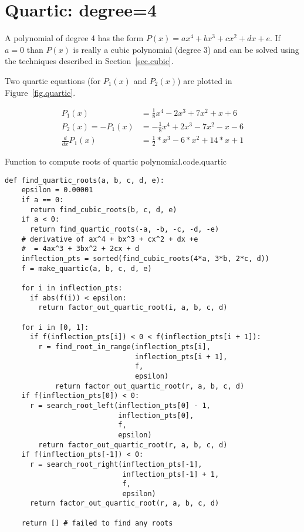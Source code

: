 \section{Quartic: degree=4}
\label{sec.quartic}

A polynomial of degree 4 has the form $P(x) = a x^4 + b x^3 + c x^2 + d x + e$. If $a=0$ than $P(x)$ is really
a cubic polynomial (degree 3) and can be solved using the techniques described in Section~\ref{sec.cubic}.

Two quartic equations (for $P_1(x)$ and $P_2(x)$) are plotted in Figure~\ref{fig.quartic}.


\begin{align*}
  P_1(x) &= \frac{1}{8}  x^4 -2 x^3 + 7  x^2 + x + 6\\
  P_2(x) = -P_1(x) &= -\frac{1}{8}  x^4 +2 x^3 - 7  x^2 - x - 6\\
  \frac{d}{dx} P_1(x) &= \frac{1}{2} * x^3 -6* x^2 + 14 * x + 1
\end{align*}


\begin{listing}{Function to compute roots of quartic polynomial.}{code.quartic}
\begin{minipage}[c]{0.98\textwidth}\begin{lstlisting}
def find_quartic_roots(a, b, c, d, e):
    epsilon = 0.00001
    if a == 0:
      return find_cubic_roots(b, c, d, e)
    if a < 0:
      return find_quartic_roots(-a, -b, -c, -d, -e)
    # derivative of ax^4 + bx^3 + cx^2 + dx +e
    #  = 4ax^3 + 3bx^2 + 2cx + d
    inflection_pts = sorted(find_cubic_roots(4*a, 3*b, 2*c, d))
    f = make_quartic(a, b, c, d, e)

    for i in inflection_pts:
      if abs(f(i)) < epsilon:
        return factor_out_quartic_root(i, a, b, c, d)

    for i in [0, 1]:
      if f(inflection_pts[i]) < 0 < f(inflection_pts[i + 1]):
        r = find_root_in_range(inflection_pts[i],
                               inflection_pts[i + 1],
                               f,
                               epsilon)
            return factor_out_quartic_root(r, a, b, c, d)
    if f(inflection_pts[0]) < 0:
      r = search_root_left(inflection_pts[0] - 1, 
                           inflection_pts[0],
                           f,
                           epsilon)
        return factor_out_quartic_root(r, a, b, c, d)
    if f(inflection_pts[-1]) < 0:
      r = search_root_right(inflection_pts[-1],
                            inflection_pts[-1] + 1, 
                            f, 
                            epsilon)
      return factor_out_quartic_root(r, a, b, c, d)

    return [] # failed to find any roots
\end{lstlisting}\end{minipage}\end{listing}
